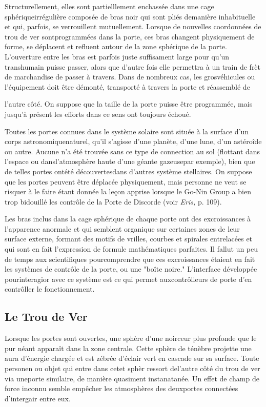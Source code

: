 {Structurellement, elles sont partielllement enchassée dans une cage sphériqueirrégulière composée de bras noir qui sont pliés demanière inhabituelle et qui, parfois, se verrouillent mutuellement. Lorsque de nouvelles coordonnées de trou de ver sontprogrammées dans la porte, ces bras changent physiquement de forme, se déplacent et refluent autour de la zone sphérique de la porte. L'ouverture entre les bras est parfois juste suffisament large pour qu'un transhumain puisse passer, alors que d'autre fois elle permettra à un train de frèt de marchandise de passer à travers. Dans de nombreux cas, les grosvéhicules ou l'équipement doit être démonté, transporté à travers la porte et réassemblé de 

l'autre côté. On suppose que la taille de la porte puisse être programmée, mais jusqu'à présent les efforts dans ce sens ont toujours échoué. 

Toutes les portes connues dans le système solaire sont située à la surface d'un corps astronomiquenaturel, qu'il s'agisse d'une planète, d'une lune, d'un astéroîde ou autre. Aucune n'a été trouvée sans ce type de connection au sol (flottant dans l'espace ou dansl'atmosphère haute d'une géante gazeusepar exemple), bien que de telles portes ontété découvertesdans d'autres système stellaires. On suppose que les portes peuvent être déplacée physiquement, mais personne ne veut se risquer à le faire étant donnée la leçon apprise lorsque le Go-Nin Group a bien trop bidouillé les contrôle de la Porte de Discorde (voir \textit{Eris, }p. 109). 

Les bras inclus dans la cage sphérique de chaque porte ont des excroissances à l'apparence anormale et qui semblent organique sur certaines zones de leur surface externe, formant des motifs de vrilles, courbes et spirales entrelacées et qui sont en fait l'expression de formule mathématiques parfaites. Il fallut un peu de temps aux scientifiques pourcomprendre que ces excroissances étaient en fait les systèmes de contrôle de la porte, ou une "boîte noire." L'interface développée pourinteragior avec ce système est ce qui permet auxcontrôlleurs de porte d'en contrôller le fonctionnement. 

\subsection{Le Trou de Ver} 

Lorsque les portes sont ouvertes, une sphère d'une noirceur plus profonde que le pur néant apparaît dans la zone centrale. Cette sphère de ténèbre projette une aura d'énergie chargée et est zébrée d'éclair vert en cascade sur sa surface. Toute personen ou objet qui entre dans cetet sphèr ressort del'autre côté du trou de ver via uneporte similaire, de manière quasiment instanatanée. Un effet de champ de force inconnu semble empêcher les atmosphères des deuxportes connectées d'intergair entre eux. 

}
